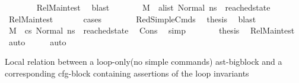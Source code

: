 \begin{isabellebody}
\ \ \ \ \ \ \isamarkupfalse%
\ Rel{\isacharunderscore}{\kern0pt}Main{\isacharunderscore}{\kern0pt}test\ \isamarkupfalse%
\ blast\isanewline
\ \ \ \ \isamarkupfalse%
\ \isamarkupfalse%
\ {\isachardoublequoteopen}M{\isacharcomma}{\kern0pt}{\isasymLambda}{\isacharcomma}{\kern0pt}{\isasymGamma}{\isacharcomma}{\kern0pt}{\isasymOmega}\ {\isasymturnstile}\ {\isasymlangle}{\isacharparenleft}{\kern0pt}a{\isacharhash}{\kern0pt}list{\isacharparenright}{\kern0pt}{\isacharcomma}{\kern0pt}\ Normal\ ns{}{\isasymrangle}\ {\isacharbrackleft}{\kern0pt}{\isasymrightarrow}{\isacharbrackright}{\kern0pt}\ reached{\isacharunderscore}{\kern0pt}state{\isachardoublequoteclose}\ \isamarkupfalse%
\ Rel{\isacharunderscore}{\kern0pt}Main{\isacharunderscore}{\kern0pt}test{\isacharparenleft}{\kern0pt}{}{\isacharparenright}{\kern0pt}\ \isanewline
\ \ \ \ \isamarkupfalse%
\ cases\isanewline
\ \ \ \ \ \ \isamarkupfalse%
\ RedSimpleCmds\ \isamarkupfalse%
\ {\isacharquery}{\kern0pt}thesis\ \isamarkupfalse%
\ blast\isanewline
\ \ \ \ \isamarkupfalse%
\isanewline
\ \ \ \ \isamarkupfalse%
\ \isamarkupfalse%
\ {\isachardoublequoteopen}M{\isacharcomma}{\kern0pt}{\isasymLambda}{\isacharcomma}{\kern0pt}{\isasymGamma}{\isacharcomma}{\kern0pt}{\isasymOmega}\ {\isasymturnstile}\ {\isasymlangle}cs{}{\isacharcomma}{\kern0pt}\ Normal\ ns{}{\isasymrangle}\ {\isacharbrackleft}{\kern0pt}{\isasymrightarrow}{\isacharbrackright}{\kern0pt}\ reached{\isacharunderscore}{\kern0pt}state{\isachardoublequoteclose}\ \isamarkupfalse%
\ Cons\ \isamarkupfalse%
\ simp\isanewline
\isanewline
\ \ \ \ \isamarkupfalse%
\ \isamarkupfalse%
\ {\isacharquery}{\kern0pt}thesis\ \isamarkupfalse%
\ Rel{\isacharunderscore}{\kern0pt}Main{\isacharunderscore}{\kern0pt}test\ \isamarkupfalse%
\ auto\isanewline
\ \ \isamarkupfalse%
\ \isanewline
{}\isamarkupfalse%
\ {\isacharparenleft}{\kern0pt}auto{\isacharparenright}{\kern0pt}%
\endisatagproof
{\isafoldproof}%
%
\isadelimproof
%
\endisadelimproof
%
\begin{isamarkuptext}%
Local relation between a loop-only(no simple commands) ast-bigblock and a corresponding cfg-block containing assertions of the loop invariants%

\end{isamarkuptext}
\end{isabellebody}
